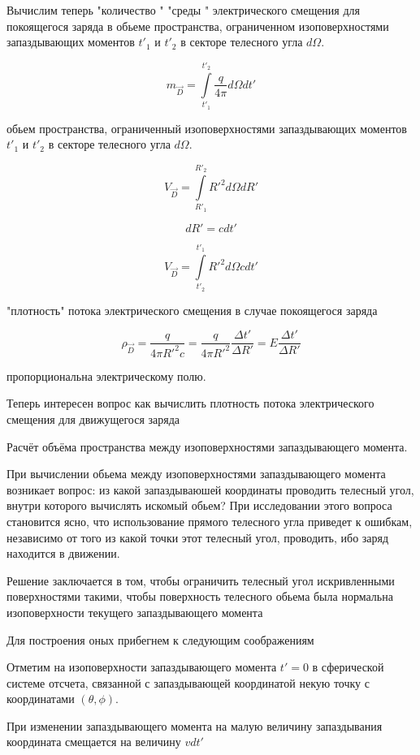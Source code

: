 \documentclass{article}
\begin{document}
Вычислим теперь "количество " "среды " электрического смещения для покоящегося заряда в обьеме пространства, ограниченном изоповерхностями запаздывающих моментов  $t'_{1}$ и $t'_{2}$ в секторе телесного угла $d\Omega$.

$$m_{\vec D} = \int\limits_{t'_{1}}^{t'_{2}}\frac{q}{4\pi}d\Omega d t'$$

обьем пространства, ограниченный изоповерхностями запаздывающих моментов  $t'_{1}$ и $t'_{2}$ в секторе телесного угла $d\Omega$.

$$V_{\vec D} = \int\limits_{R'_{1}}^{R'_{2}}{R'}^2 d\Omega d R' $$


$$d R' = c d t'$$

$$V_{\vec D} = \int\limits_{t'_{2}}^{t'_{1}}{R'}^2 d \Omega c d t'$$


"плотность" потока электрического смещения в случае покоящегося заряда

$$\rho_{\vec D} = \frac{q}{4\pi {R'}^2 c} =  \frac{q}{4\pi {R'}^2}\frac{\Delta t'}{\Delta R'} = E\frac{\Delta t'}{\Delta R'}$$

пропорциональна электрическому полю.

Теперь интересен вопрос как вычислить плотность потока электрического смещения для движущегося заряда

Расчёт объёма пространства между изоповерхностями запаздывающего момента.

При вычислении обьема между изоповерхностями запаздывающего момента возникает вопрос: из какой запаздываюшей координаты проводить телесный угол, внутри которого вычислять искомый обьем? При исследовании этого вопроса становится ясно, что использование прямого телесного угла приведет к ошибкам, независимо от того из какой точки этот телесный угол, проводить, ибо заряд находится в движении. 

Решение заключается в том, чтобы ограничить телесный угол искривленными поверхностями такими, чтобы поверхность телесного обьема была нормальна изоповерхности текущего запаздывающего момента

Для построения оных прибегнем к следующим соображениям 

Отметим на изоповерхности запаздывающего момента $t'=0$ в сферической системе отсчета, связанной с запаздывающей координатой некую точку с координатами $(\theta, \phi)$.

При изменении запаздывающего момента на малую величину запаздывания координата смещается на величину $v dt'$
\end{document}
